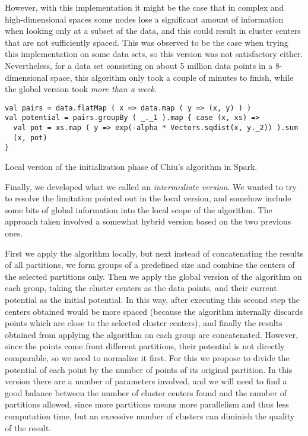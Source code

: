 However, with this implementation it might be the case that in complex and high-dimensional spaces some nodes lose a significant amount of information when looking only at a subset of the data, and this could result in cluster centers that are not sufficiently spaced. This was observed to be the case when trying this implementation on some data sets, so this version was not satisfactory either. Nevertheless, for a data set consisting on about 5 million data points in a 8-dimensional space, this algorithm only took a couple of minutes to finish, while the global version took \textit{more than a week}.

\begin{Listing}[h!]
\begin{lstlisting}[basicstyle=\normalsize\ttfamily, xleftmargin=.5cm, aboveskip=0em, belowskip=0em]
val pairs = data.flatMap ( x => data.map ( y => (x, y) ) )
val potential = pairs.groupBy ( _._1 ).map { case (x, xs) =>
  val pot = xs.map ( y => exp(-alpha * Vectors.sqdist(x, y._2)) ).sum
  (x, pot)
}
\end{lstlisting}
\caption{Local version of the initialization phase of Chiu's algorithm in Spark.}
  \label{lst:chiu-local}
\end{Listing}

Finally, we developed what we called an \textit{intermediate version}. We wanted to try to resolve the limitation pointed out in the local version, and somehow include some bits of global information into the local scope of the algorithm. The approach taken involved a somewhat hybrid version based on the two previous ones.

First we apply the algorithm locally, but next instead of concatenating the results of all partitions, we form groups of a predefined size and combine the centers of the selected partitions only. Then we apply the global version of the algorithm on each group, taking the cluster centers as the data points, and their current potential as the initial potential. In this way, after executing this second step the centers obtained would be more spaced (because the algorithm internally discards points which are close to the selected cluster centers), and finally the results obtained from applying the algorithm on each group are concatenated. However, since the points come front different partitions, their potential is not directly comparable, so we need to normalize it first. For this we propose to divide the potential of each point by the number of points of its original partition. In this version there are a number of parameters involved, and we will need to find a good balance between the number of cluster centers found and the number of partitions allowed, since more partitions means more parallelism and thus less computation time, but an excessive number of clusters can diminish the quality of the result.


